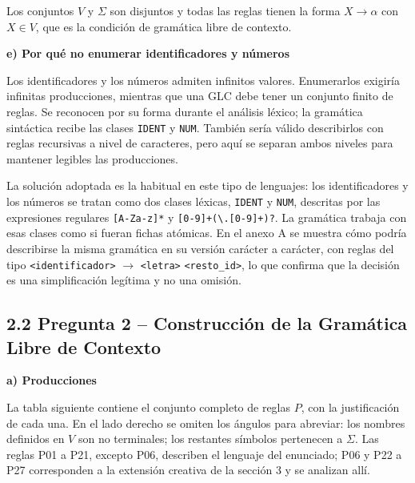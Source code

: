\documentclass[11pt,letterpaper]{article}
\newcommand{\apartado}[1]{\par\Needspace{4\baselineskip}\medskip\noindent\textbf{#1}\par\nobreak\smallskip}
\newcommand{\nt}[1]{\texttt{\textless #1\textgreater}}
\begin{document}
Los conjuntos $V$ y $\Sigma$ son disjuntos y todas las reglas tienen la forma $X\rightarrow\alpha$ con
$X\in V$, que es la condición de gramática libre de contexto.

\apartado{e) Por qué no enumerar identificadores y números}

Los identificadores y los números admiten infinitos valores. Enumerarlos exigiría infinitas
producciones, mientras que una GLC debe tener un conjunto finito de reglas. Se reconocen por su
forma durante el análisis léxico; la gramática sintáctica recibe las clases \texttt{IDENT} y
\texttt{NUM}. También sería válido describirlos con reglas recursivas a nivel de caracteres,
pero aquí se separan ambos niveles para mantener legibles las producciones.

La solución adoptada es la habitual en este tipo de lenguajes: los identificadores y los números se
tratan como dos clases léxicas, \texttt{IDENT} y \texttt{NUM}, descritas por las expresiones
regulares \texttt{[A-Za-z]\allowbreak[A-Za-z0-9\_]*} y \texttt{[0-9]+(\allowbreak\textbackslash.[0-9]+)?}. La gramática
trabaja con esas clases como si fueran fichas atómicas. En el anexo A se muestra cómo podría
describirse la misma gramática en su versión carácter a carácter, con reglas del tipo
\nt{identificador} $\rightarrow$ \nt{letra} \nt{resto\_id}, lo que confirma que la decisión es una
simplificación legítima y no una omisión.

\subsection*{2.2 Pregunta 2 -- Construcción de la Gramática Libre de Contexto}

\apartado{a) Producciones}

La tabla siguiente contiene el conjunto completo de reglas $P$, con la justificación de cada una.
En el lado derecho se omiten los ángulos para abreviar: los nombres definidos en $V$ son
no terminales; los restantes símbolos pertenecen a $\Sigma$.
Las reglas P01 a P21, excepto P06, describen el lenguaje del enunciado; P06 y P22 a P27 corresponden a
la extensión creativa de la sección 3 y se analizan allí.
\end{document}
